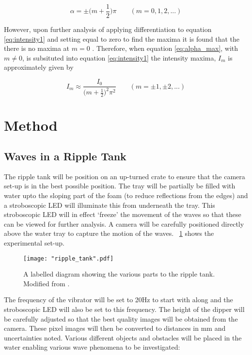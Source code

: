 \documentclass{article}
\newcommand{\figref}[2][\figurename~]{#1\ref{#2}}
\begin{document}
\begin{equation}
\label{eq:alpha_max}
\alpha = \pm\bigg(m + \frac{1}{2}\bigg)\pi \quad\quad(m = 0, 1, 2, ...)
\end{equation}

\vspace{2mm}
\noindent
However, upon further analysis of applying differentiation to equation \eqref{eq:intensity1} and setting equal to zero to find the maxima it is found that the there is no maxima at $m = 0$ \cite{Book01}. Therefore, when equation \eqref{eq:alpha_max}, with $m \neq 0$, is subsituted into equation \eqref{eq:intensity1} the intensity maxima, $I_m$ is approximately given by \cite{Book01}

\vspace{2mm}
\noindent
\begin{equation}
\label{eq:max_intensity}
I_m \approx \frac{I_0}{\big(m + \frac{1}{2}\big)^2\pi^2} \quad\quad(m =  \pm1, \pm2, ...)
\end{equation}


\section{Method}
\label{sec:method}

\subsection{Waves in a Ripple Tank}
\label{ssec:ripple-method}

The ripple tank will be position on an up-turned crate \cite{Paper01} to ensure that the camera set-up is in the best possible position. The tray will be partially be filled with water upto the sloping part of the foam \cite{Paper01} (to reduce reflections from the edges) and a stroboscopic LED will illuminate this from underneath the tray. This stroboscopic LED will in effect `freeze' the movement of the waves so that these can be viewed for further analysis. A camera will be carefully positioned directly above the water tray to capture the motion of the waves. \figref{fig:ripple_tank} shows the experimental set-up.

\begin{figure}[h]
\centering
\texttt{[image: "ripple\_tank".pdf]}
\caption{A labelled diagram showing the various parts to the ripple tank. Modified from \cite{Paper01}.}
\label{fig:ripple_tank}
\end{figure}

\vspace{2mm}
\noindent
The frequency of the vibrator will be set to 20Hz to start with along and the stroboscopic LED will also be set to this frequency. The height of the dipper will be carefully adjusted so that the best quality images will be obtained from the camera. These pixel images will then be converted to distances in mm and uncertainties noted. Various different objects and obstacles will be placed in the water enabling various wave phenomena to be investigated:
\end{document}

